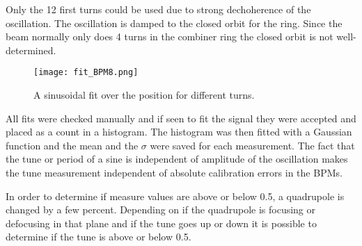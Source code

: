 Only the 12 first turns could be used due to strong dechoherence 
of the oscillation. The oscillation is damped to the closed orbit for the ring. 
Since the beam normally only does 4 turns in the combiner ring 
the closed orbit is not well-determined. 
\begin{figure}[!h]
\centering
\texttt{[image: fit\_BPM8.png]}
\caption{A sinusoidal fit over the position for different turns. \label{fig:fitOfPosition}}
\end{figure}
All fits were checked manually and if seen to fit the signal they were accepted and
placed as a count in a histogram. 
The histogram was then fitted with a Gaussian function and the mean and 
the $\sigma$ were saved for each measurement.
The fact that the tune or period of a sine is 
independent of amplitude of the oscillation makes the tune measurement 
independent of absolute calibration errors in the BPMs.
 
In order to determine if measure values are above or below 0.5, 
a quadrupole is changed by a few percent. 
Depending on if the quadrupole is focusing or 
defocusing in that plane and if the tune goes up or down it is possible to 
determine if the tune is above or below 0.5.  

